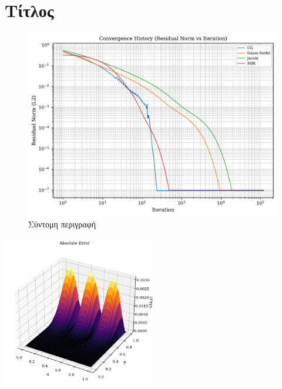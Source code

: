 \section{Τίτλος}

\begin{figure}[h!]
    \centering
    \includegraphics[width=0.60\linewidth]{doc/figures/convergence_plot.pdf}
    \caption{Σύντομη περιγραφή}
    \label{fig:placeholder}
\end{figure}

\begin{image}
    \centering
    \includegraphics[width=0.50\textwidth]{doc/images/abs_error_surface.pdf}
    \caption{Σύντομη περιγραφή}
    \label{img:example}
\end{image}


